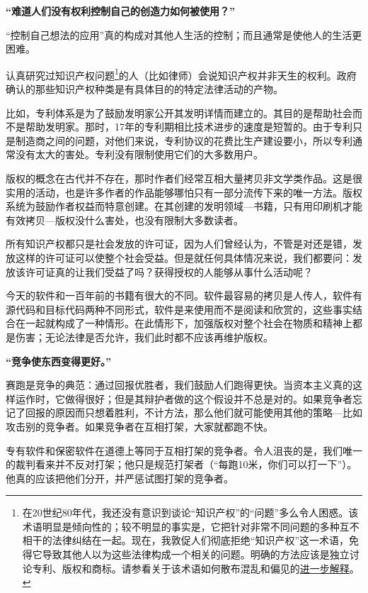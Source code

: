 \bf“难道人们没有权利控制自己的创造力如何被使用？”\normalall\par
“控制自己想法的应用”真的构成对其他人生活的控制；而且通常是使他人的生活更困难。\par
认真研究过知识产权问题\footnote{在20世纪80年代，我还没有意识到谈论“知识产权”的“问题”多么令人困惑。该术语明显是倾向性的；较不明显的事实是，它把针对非常不同问题的多种互不相干的法律纠结在一起。现在，我敦促人们彻底拒绝“知识产权”这一术语，免得它导致其他人以为这些法律构成一个相关的问题。明确的方法应该是独立讨论专利、版权和商标。请参看关于该术语如何散布混乱和偏见的\href{http://www.gnu.org/philosophy/not-ipr.html}{进一步解释}。}的人（比如律师）会说知识产权并非天生的权利。政府确认的那些知识产权种类是有具体目的的特定法律活动的产物。\par
比如，专利体系是为了鼓励发明家公开其发明详情而建立的。其目的是帮助社会而不是帮助发明家。那时，17年的专利期相比技术进步的速度是短暂的。由于专利只是制造商之间的问题，对他们来说，专利协议的花费比生产建设要小，所以专利通常没有太大的害处。专利没有限制使用它们的大多数用户。\par
版权的概念在古代并不存在，那时作者们经常互相大量拷贝非文学类作品。这是很实用的活动，也是许多作者的作品能够哪怕只有一部分流传下来的唯一方法。版权系统为鼓励作者权益而特意创建。在其创建的发明领域—书籍，只有用印刷机才能有效拷贝—版权没什么害处，也没有限制大多数读者。\par
所有知识产权都只是社会发放的许可证，因为人们曾经认为，不管是对还是错，发放这样的许可证可以使整个社会受益。但是就任何具体情况来说，我们都要问：发放该许可证真的让我们受益了吗？获得授权的人能够从事什么活动呢？\par
今天的软件和一百年前的书籍有很大的不同。软件最容易的拷贝是人传人，软件有源代码和目标代码两种不同形式，软件是来使用而不是阅读和欣赏的，这些事实结合在一起就构成了一种情形。在此情形下，加强版权对整个社会在物质和精神上都是伤害；无论法律是否允许，我们此时都不应该再维护版权。\par
\bf“竞争使东西变得更好。”\normalall\par
赛跑是竞争的典范：通过回报优胜者，我们鼓励人们跑得更快。当资本主义真的这样运作时，它做得很好；但是其辩护者做的这个假设并不总是对的。如果竞争者忘记了回报的原因而只想着胜利，不计方法，那么他们就可能使用其他的策略—比如攻击别的竞争者。如果竞争者在互相打架，大家就都跑不快。\par
专有软件和保密软件在道德上等同于互相打架的竞争者。令人沮丧的是，我们唯一的裁判看来并不反对打架；他只是规范打架者（“每跑10米，你们可以打一下”）。他真的应该把他们分开，并严惩试图打架的竞争者。\par
